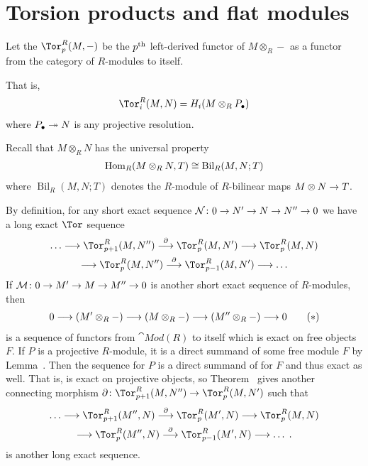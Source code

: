\documentclass[a4paper,parskip=half,numbers=enddot, DIV=12]{scrreprt}
\begin{document}
\section{Torsion products and flat modules}
\begin{defi}
	Let the  $\Tor_p^R(M,-)$ be the $p^{\text{th}}$ left-derived functor of $M\otimes_R -$ as a functor from the category of $R$-modules to itself. 
\end{defi}
That is, 
\begin{align}\lbl{eq:TorDef}
	\Tor_i^R(M,N)=H_i(M\otimes_RP_\bullet)
\end{align}
where $P_\bullet \epimorphism N$ is any projective resolution.
\begin{rem*}
	\begin{alphanumerate}
		\item Recall that $M\otimes_RN$ has the universal property
		\begin{align*}
			\operatorname{Hom}_R(M\otimes_RN,T)\cong \operatorname{Bil}_R(M,N;T)
		\end{align*}
		where $\operatorname{Bil}_R(M,N;T)$ denotes the $R$-module of $R$-bilinear maps $M\otimes N\morphism T$.
		\item By definition, for any short exact sequence $\Nn\colon 0\morphism N'\morphism N\morphism N''\morphism 0$ we have a long exact $\Tor$ sequence 
		\begin{multline}\lbl{eq:TorSeq1}
			\ldots\morphism\Tor_{p+1}^R(M,N'')\morphism[\partial]\Tor_p^R(M,N')\morphism\Tor_p^R(M,N)\\
			\morphism\Tor_p^R(M,N'')\morphism[\partial]\Tor_{p-1}^R(M,N')\morphism\ldots
		\end{multline}		
		If $\Mm\colon 0\morphism M'\morphism M\morphism M''\morphism 0$ is another short exact sequence of $R$-modules, then
		\begin{align}\lbl{eq:TorFuncSeq}
			0\morphism (M'\otimes_R -)\morphism (M\otimes _R-)\morphism (M''\otimes_R-)\morphism 0\tag{$*$}
		\end{align}
		is a sequence of functors from $\cat{Mod}(R)$ to itself which is exact on free objects $F$. If $P$ is a projective $R$-module, it is a direct summand of some free module $F$ by Lemma~. Then the sequence  for $P$ is a direct summand of  for $F$ and thus exact as well. That is,  is exact on projective objects, so Theorem~ gives another connecting morphism $\partial\colon \Tor_{p+1}^R(M,N'')\morphism\Tor_p^R(M,N')$ such that
		\begin{multline}\lbl{eq:TorSeq2}
			\ldots\morphism\Tor_{p+1}^R(M'',N)\morphism[\partial]\Tor_p^R(M',N)\morphism\Tor_p^R(M,N)\\
			\morphism\Tor_p^R(M'',N)\morphism[\partial]\Tor_{p-1}^R(M',N)\morphism\ldots\;.
		\end{multline}
		is another long exact sequence.
	\end{alphanumerate}
\end{rem*}
\end{document}
